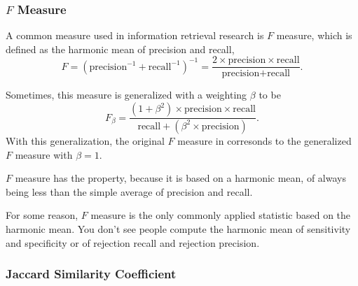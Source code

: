 \subsubsection{$F$ Measure}

A common measure used in information retrieval research is $F$ measure,
which is defined as the harmonic mean of precision and recall,
%
\begin{equation}\label{eq:f-measure}
F
= \left( \mbox{precision}^{-1} + \mbox{recall}^{-1} \right)^{-1}
= \frac{2 \times \mbox{precision} \times \mbox{recall}}
         {\mbox{precision} + \mbox{recall}}.
\end{equation}

Sometimes, this measure is generalized with a weighting $\beta$
to be
%
\begin{equation}
F_{\beta} = \frac{(1 + \beta^2) \times \mbox{precision} \times \mbox{recall}}
                {\mbox{recall} + (\beta^2 \times \mbox{precision})}.
\end{equation}
%
With this generalization, the original $F$ measure in
 corresonds to the generalized $F$ measure with
$\beta=1$.  

$F$ measure has the property, because it is based on a harmonic mean,
of always being less than the simple average of precision and recall.

For some reason, $F$ measure is the only commonly applied statistic
based on the harmonic mean.  You don't see people compute the harmonic
mean of sensitivity and specificity or of rejection recall and
rejection precision.

\subsubsection{Jaccard Similarity Coefficient}


